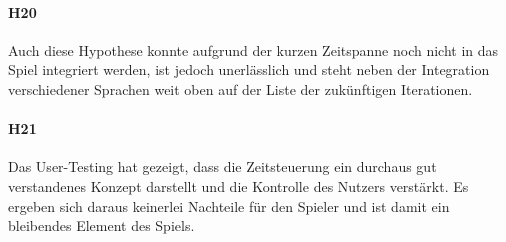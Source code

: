 \paragraph*{H20}
Auch diese Hypothese konnte aufgrund der kurzen Zeitspanne noch nicht in das Spiel integriert werden, ist jedoch unerlässlich und steht neben der Integration verschiedener Sprachen weit oben auf der Liste der zukünftigen Iterationen.

\paragraph*{H21}
Das User-Testing hat gezeigt, dass die Zeitsteuerung ein durchaus gut verstandenes Konzept darstellt und die Kontrolle des Nutzers verstärkt. Es ergeben sich daraus keinerlei Nachteile für den Spieler und ist damit ein bleibendes Element des Spiels.